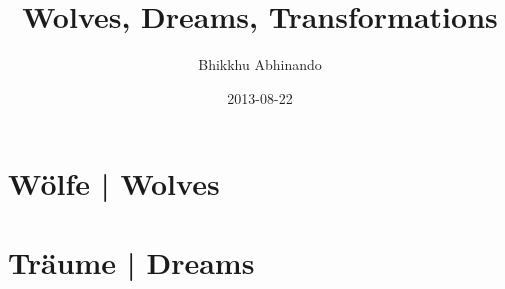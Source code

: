 \documentclass[11pt,twoside,final]{memoir}
\title{Wolves, Dreams, Transformations}
\subtitle{}
\author{Bhikkhu Abhinando}
\date{2013-08-22}
\begin{document}
\emptysheet
\frontmatter*







\cleartoverso
\tableofcontents*

\mainmatter*
\setcounter{chapter}{0}

\part{Wölfe | Wolves}





























\part{Träume | Dreams}








\end{document}
